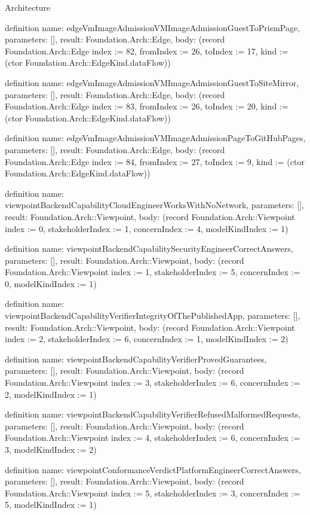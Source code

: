\begin{lexlean}{Architecture}
\begin{semanticmodule}
definition{
  name: edgeVmImageAdmissionVMImageAdmissionGuestToPrismPage,
  parameters: [],
  result: Foundation.Arch::Edge,
  body: (record Foundation.Arch::Edge {index := 82, fromIndex := 26, toIndex := 17, kind := (ctor Foundation.Arch::EdgeKind.dataFlow)})
}

definition{
  name: edgeVmImageAdmissionVMImageAdmissionGuestToSiteMirror,
  parameters: [],
  result: Foundation.Arch::Edge,
  body: (record Foundation.Arch::Edge {index := 83, fromIndex := 26, toIndex := 20, kind := (ctor Foundation.Arch::EdgeKind.dataFlow)})
}

definition{
  name: edgeVmImageAdmissionVMImageAdmissionPageToGitHubPages,
  parameters: [],
  result: Foundation.Arch::Edge,
  body: (record Foundation.Arch::Edge {index := 84, fromIndex := 27, toIndex := 9, kind := (ctor Foundation.Arch::EdgeKind.dataFlow)})
}

definition{
  name: viewpointBackendCapabilityCloudEngineerWorksWithNoNetwork,
  parameters: [],
  result: Foundation.Arch::Viewpoint,
  body: (record Foundation.Arch::Viewpoint {index := 0, stakeholderIndex := 1, concernIndex := 4, modelKindIndex := 1})
}

definition{
  name: viewpointBackendCapabilitySecurityEngineerCorrectAnswers,
  parameters: [],
  result: Foundation.Arch::Viewpoint,
  body: (record Foundation.Arch::Viewpoint {index := 1, stakeholderIndex := 5, concernIndex := 0, modelKindIndex := 1})
}

definition{
  name: viewpointBackendCapabilityVerifierIntegrityOfThePublishedApp,
  parameters: [],
  result: Foundation.Arch::Viewpoint,
  body: (record Foundation.Arch::Viewpoint {index := 2, stakeholderIndex := 6, concernIndex := 1, modelKindIndex := 2})
}

definition{
  name: viewpointBackendCapabilityVerifierProvedGuarantees,
  parameters: [],
  result: Foundation.Arch::Viewpoint,
  body: (record Foundation.Arch::Viewpoint {index := 3, stakeholderIndex := 6, concernIndex := 2, modelKindIndex := 1})
}

definition{
  name: viewpointBackendCapabilityVerifierRefusedMalformedRequests,
  parameters: [],
  result: Foundation.Arch::Viewpoint,
  body: (record Foundation.Arch::Viewpoint {index := 4, stakeholderIndex := 6, concernIndex := 3, modelKindIndex := 2})
}

definition{
  name: viewpointConformanceVerdictPlatformEngineerCorrectAnswers,
  parameters: [],
  result: Foundation.Arch::Viewpoint,
  body: (record Foundation.Arch::Viewpoint {index := 5, stakeholderIndex := 3, concernIndex := 5, modelKindIndex := 1})
}


\end{semanticmodule}
\end{lexlean}
